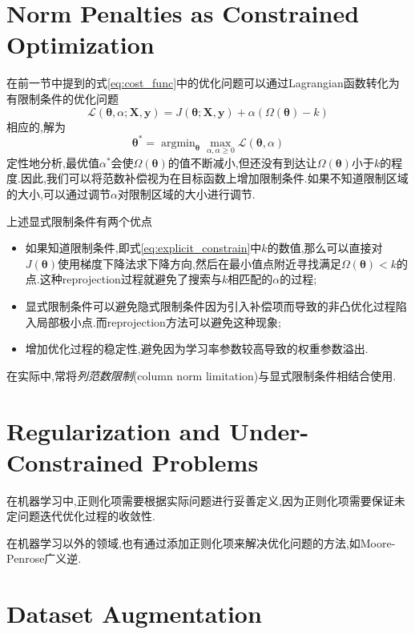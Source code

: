 \section{Norm Penalties as Constrained Optimization}

在前一节中提到的式\ref{eq:cost_func}中的优化问题可以通过Lagrangian函数转化为有限制条件的优化问题
\begin{equation}\label{eq:explicit_constrain}
\mathcal L({\bm\theta},\alpha;\bm{X,y})=J({\bm\theta};\bm{X,y})+\alpha(\Omega({\bm\theta})-k)
\end{equation}
相应的,解为
\begin{equation}
{\bm\theta}^\ast=\mathop{\arg\min}_{\bm\theta}\max_{\alpha,\alpha\ge 0}\mathcal L({\bm\theta},\alpha)
\end{equation}
定性地分析,最优值$\alpha^\ast$会使$\Omega({\bm\theta})$的值不断减小,但还没有到达让$\Omega({\bm\theta})$小于$k$的程度.因此,我们可以将范数补偿视为在目标函数上增加限制条件.如果不知道限制区域的大小,可以通过调节$\alpha$对限制区域的大小进行调节.

上述显式限制条件有两个优点
\begin{itemize}
    \item 如果知道限制条件,即式\ref{eq:explicit_constrain}中$k$的数值,那么可以直接对$J({\bm\theta})$使用梯度下降法求下降方向,然后在最小值点附近寻找满足$\Omega({\bm\theta})<k$的点.这种reprojection过程就避免了搜索与$k$相匹配的$\alpha$的过程;
    \item 显式限制条件可以避免隐式限制条件因为引入补偿项而导致的非凸优化过程陷入局部极小点.而reprojection方法可以避免这种现象;
    \item 增加优化过程的稳定性,避免因为学习率参数较高导致的权重参数溢出.
\end{itemize}

在实际中,常将\textit{列范数限制}(column norm limitation)与显式限制条件相结合使用.

\section{Regularization and Under-Constrained Problems}

在机器学习中,正则化项需要根据实际问题进行妥善定义,因为正则化项需要保证未定问题迭代优化过程的收敛性.

在机器学习以外的领域,也有通过添加正则化项来解决优化问题的方法,如Moore-Penrose广义逆.

\section{Dataset Augmentation}

